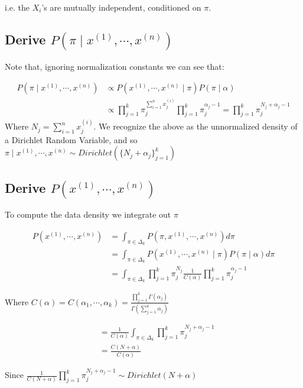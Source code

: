 \documentclass[paper=a4, fontsize=11pt]{scrartcl} %
\numberwithin{equation}{section} %
\numberwithin{figure}{section} %
\numberwithin{table}{section} %
\begin{document}
i.e. the $X_i$'s are mutually independent, conditioned on $\pi$.

\subsection{Derive $P(\pi \mid x^{(1)}, \cdots, x^{(n)})$}

Note that, ignoring normalization constants we can see that:

\begin{align*}
P(\pi \mid x^{(1)}, \cdots, x^{(n)}) &\propto P(x^{(1)}, \cdots, x^{(n)} \mid \pi )P(\pi \mid \alpha) \\
&\propto \prod_{j=1}^{k}\pi_{j}^{\sum_{i=1}^{n}x_{j}^{(i)}}\prod_{j=1}^{k}\pi_{j}^{\alpha_j-1} = \prod_{j=1}^{k}\pi_{j}^{N_j + \alpha_j-1}
\end{align*}
Where $N_j = \sum_{i=1}^{n}x_{j}^{(i)}$.
We recognize the above as the unnormalized density of a Dirichlet Random Variable, and so
$\pi \mid x^{(1)}, \cdots, x^{(n)} \sim Dirichlet(\{N_j + \alpha_j\}_{j=1}^k)$


\subsection{Derive $P(x^{(1)}, \cdots, x^{(n)})$}

To compute the data density we integrate out $\pi$ 

\begin{align*}
P(x^{(1)}, \cdots, x^{(n)}) &= \int_{\pi \in \Delta_k} P(\pi, x^{(1)}, \cdots, x^{(n)})d\pi \\
&= \int_{\pi \in \Delta_k} P(x^{(1)}, \cdots, x^{(n)} \mid \pi) P(\pi \mid \alpha)d\pi \\
&= \int_{\pi \in \Delta_k} \prod_{j=1}^{k}\pi_{j}^{N_j} \frac{1}{C(\alpha)} \prod_{j=1}^{k}\pi_{j}^{\alpha_j-1} 
\end{align*}

Where $C(\alpha) = C(\alpha_1, \cdots, \alpha_k) = \frac{\prod_{j=1}^{k}\Gamma(\alpha_j)}{\Gamma\left(\sum_{j=1}^{k}\alpha_j\right)}$

\begin{align*}
&= \frac{1}{C(\alpha)} \int_{\pi \in \Delta_k} \prod_{j=1}^{k}\pi_{j}^{N_j + \alpha_j-1} \\
&= \frac{C(N + \alpha)}{C(\alpha)}
\end{align*}

Since $\frac{1}{C(N + \alpha)}\prod_{j=1}^{k}\pi_{j}^{N_j + \alpha_j-1} \sim Dirichlet(N+\alpha)$
\end{document}
